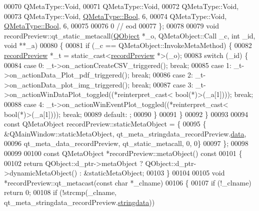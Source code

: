 \begin{DoxyCode}
00070     QMetaType::Void,
00071     QMetaType::Void,
00072     QMetaType::Void,
00073     QMetaType::Void, \hyperlink{a00004_a76a8b016e5ad61faf9062cc387df5016}{QMetaType::Bool},    6,
00074     QMetaType::Void, \hyperlink{a00004_a76a8b016e5ad61faf9062cc387df5016}{QMetaType::Bool},    6,
00075 
00076        0        \textcolor{comment}{// eod}
00077 \};
00078 
00079 \textcolor{keywordtype}{void} recordPreview::qt\_static\_metacall(\hyperlink{a00059}{QObject} *\_o, QMetaObject::Call \_c, \textcolor{keywordtype}{int} \_id, \textcolor{keywordtype}{void} **\_a)
00080 \{
00081     \textcolor{keywordflow}{if} (\_c == QMetaObject::InvokeMetaMethod) \{
00082         \hyperlink{a00073}{recordPreview} *\_t = \textcolor{keyword}{static\_cast<}\hyperlink{a00073}{recordPreview} *\textcolor{keyword}{>}(\_o);
00083         \textcolor{keywordflow}{switch} (\_id) \{
00084         \textcolor{keywordflow}{case} 0: \_t->on\_actionCreateCSV\_triggered(); \textcolor{keywordflow}{break};
00085         \textcolor{keywordflow}{case} 1: \_t->on\_actionData\_Plot\_pdf\_triggered(); \textcolor{keywordflow}{break};
00086         \textcolor{keywordflow}{case} 2: \_t->on\_actionData\_plot\_img\_triggered(); \textcolor{keywordflow}{break};
00087         \textcolor{keywordflow}{case} 3: \_t->on\_actionWinDataPlot\_toggled((*\textcolor{keyword}{reinterpret\_cast<} \textcolor{keywordtype}{bool}(*)\textcolor{keyword}{>}(\_a[1]))); \textcolor{keywordflow}{break};
00088         \textcolor{keywordflow}{case} 4: \_t->on\_actionWinEventPlot\_toggled((*\textcolor{keyword}{reinterpret\_cast<} \textcolor{keywordtype}{bool}(*)\textcolor{keyword}{>}(\_a[1]))); \textcolor{keywordflow}{break};
00089         \textcolor{keywordflow}{default}: ;
00090         \}
00091     \}
00092 \}
00093 
00094 \textcolor{keyword}{const} QMetaObject recordPreview::staticMetaObject = \{
00095     \{ &QMainWindow::staticMetaObject, qt\_meta\_stringdata\_recordPreview.\hyperlink{a00068_a61be725f4f67b385a56830793423ff45}{data},
00096       qt\_meta\_data\_recordPreview,  qt\_static\_metacall, 0, 0\}
00097 \};
00098 
00099 
00100 \textcolor{keyword}{const} QMetaObject *recordPreview::metaObject()\textcolor{keyword}{ const}
00101 \textcolor{keyword}{}\{
00102     \textcolor{keywordflow}{return} QObject::d\_ptr->metaObject ? QObject::d\_ptr->dynamicMetaObject() : &staticMetaObject;
00103 \}
00104 
00105 \textcolor{keywordtype}{void} *recordPreview::qt\_metacast(\textcolor{keyword}{const} \textcolor{keywordtype}{char} *\_clname)
00106 \{
00107     \textcolor{keywordflow}{if} (!\_clname) \textcolor{keywordflow}{return} 0;
00108     \textcolor{keywordflow}{if} (!strcmp(\_clname, qt\_meta\_stringdata\_recordPreview.\hyperlink{a00068_af0762b30c491f46fa9caf80c9ae5f6ca}{stringdata}))

\end{DoxyCode}
